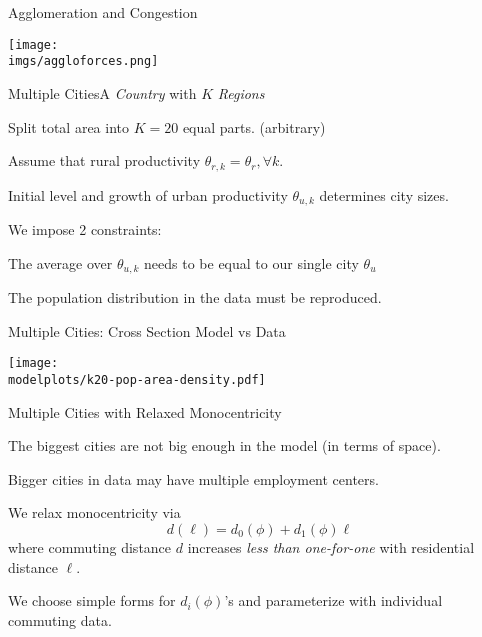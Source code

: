 \documentclass[aspectratio=169]{beamer}
\begin{document}
\begin{frame}{Agglomeration and Congestion}

	\begin{adjustbox}{center}
		\texttt{[image: \\imgs/aggloforces.png]}
	\end{adjustbox}
	
\end{frame} 		


\begin{frame}{Multiple Cities}{A \emph{Country} with $K$ \emph{Regions}}
\begin{midi}
\item Split total area into $K=20$ equal parts. (arbitrary)
\item Assume that rural productivity $\theta_{r,k}=\theta_{r}, \forall k$.
\item Initial level and growth of urban productivity $\theta_{u,k}$ determines city 
sizes.
\end{midi}
\pause
\bigskip
We impose 2 constraints:
\medskip
\begin{mide}
	\item The average over $\theta_{u,k}$ needs to be equal to our single city $\theta_{u}$
	\item The population distribution in the data must be reproduced.
\end{mide}
\end{frame}

\begin{frame}{Multiple Cities: Cross Section Model vs Data}
	\begin{adjustbox}{center}
		\texttt{[image: \\modelplots/k20-pop-area-density.pdf]}
	\end{adjustbox}
\end{frame}

\begin{frame}{Multiple Cities with Relaxed Monocentricity}

	\begin{midi}
		\item The biggest cities are not big enough in the model (in terms of space).
		\item Bigger cities in data may have multiple employment centers.
		\item We relax monocentricity via 
		\begin{equation*}
			d(\ell) = d_0(\phi) + d_1(\phi) \ell
		\end{equation*}
		where commuting distance $d$ increases \emph{less than one-for-one} with residential distance $\ell$.
		\item We choose simple forms for $d_i(\phi)$'s and parameterize with individual commuting data.
	\end{midi}
	
\end{frame}
\end{document}
